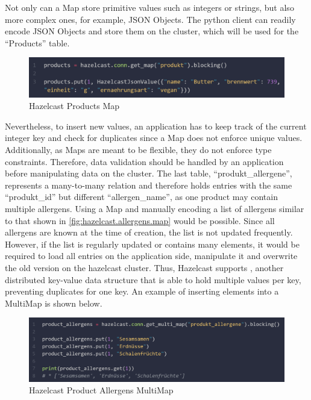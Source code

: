 Not only can a Map store primitive values such as integers or strings, but also more complex ones, for 
example, JSON Objects. The python client can readily encode JSON Objects and store them on the cluster, 
which will be used for the \enquote{Products} table.
\parencite{Hazelcast.PythonClient.HazelcastJsonValue}

\begin{figure}[H]
    \includegraphics[width=1\textwidth]{images/hazelcast.products.map.png}
    \caption{Hazelcast Products Map} \label{fig:hazelcast.products.map}
\end{figure}

Nevertheless, to insert new values, an application has to keep track of the current integer key and check 
for duplicates since a Map does not enforce unique values. Additionally, as Maps are meant to be flexible, 
they do not enforce type constraints. Therefore, data validation should be handled by an application before 
manipulating data on the cluster.
The last table, \enquote{produkt\_allergene}, 
represents a many-to-many relation and therefore holds entries with the 
same \enquote{produkt\_id} but different \enquote{allergen\_name}, as one product may contain multiple allergens.
Using a Map and manually encoding a list of allergens similar to that shown in \autoref{fig:hazelcast.allergens.map} 
would be possible. Since all allergens are known at the time of creation, the 
list is not updated frequently. However, if the list is regularly updated or contains many elements, it 
would be required to load all entries on the application side, manipulate it and overwrite the old version 
on the hazelcast cluster. 
Thus, Hazelcast supports \textcite{Hazelcast.DataStructure.MultiMap}, another distributed key-value data structure that is able to hold 
multiple values per key, preventing duplicates for one key. 
An example of inserting elements into a MultiMap is shown below.

\begin{figure}[H]
    \includegraphics[width=1\textwidth]{images/hazelcast.product_allergens.multimap.1.png}
    \caption{Hazelcast Product Allergens MultiMap} \label{fig:hazelcast.product_allergens.1.multimap}
\end{figure}

